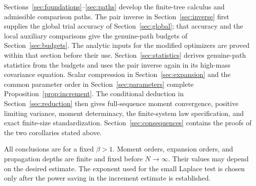 Sections~\ref{sec:foundations}--\ref{sec:paths} develop the finite-tree
calculus and admissible comparison paths. The pair inverse in
Section~\ref{sec:inverse} first supplies the global trial accuracy of
Section~\ref{sec:global}; that accuracy and the local auxiliary comparisons
give the genuine-path budgets of Section~\ref{sec:budgets}. The analytic
inputs for the modified optimizers are proved within that section before
their use. Section~\ref{sec:statistics} derives genuine-path statistics
from the budgets and uses the pair inverse again in its high-mass
covariance equation. Scalar compression in Section~\ref{sec:expansion}
and the common parameter order in Section~\ref{sec:parameters} complete
Proposition~\ref{prop:increment}. The conditional deduction in
Section~\ref{sec:reduction} then gives full-sequence moment convergence,
positive limiting variance, moment determinacy, the finite-system law
specification, and exact finite-size standardization. Section~\ref{sec:consequences}
contains the proofs of the two corollaries stated above.

All conclusions are for a fixed $\beta>1$. Moment orders, expansion orders, and propagation depths are finite and fixed before $N\to\infty$. Their values may depend on the desired estimate. The exponent used for the small Laplace test is chosen only after the power saving in the increment estimate is established.
